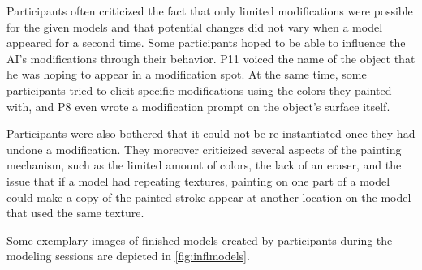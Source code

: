 Participants often criticized the fact that only limited modifications were possible for the given models and that potential changes did not vary when a model appeared for a second time. Some participants hoped to be able to influence the AI's modifications through their behavior. P11 voiced the name of the object that he was hoping to appear in a modification spot. At the same time, some participants tried to elicit specific modifications using the colors they painted with, and P8 even wrote a modification prompt on the object's surface itself.

Participants were also bothered that it could not be re-instantiated once they had undone a modification. They moreover criticized several aspects of the painting mechanism, such as the limited amount of colors, the lack of an eraser, and the issue that if a model had repeating textures, painting on one part of a model could make a copy of the painted stroke appear at another location on the model that used the same texture.



Some exemplary images of finished models created by participants during the modeling sessions are depicted in \autoref{fig:inflmodels}.
















